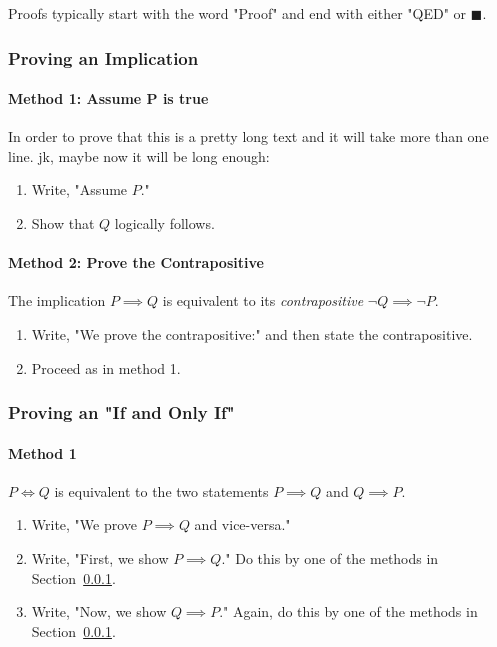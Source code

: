 \documentclass[../main.tex]{subfiles}
\begin{document}
Proofs typically start with the word "Proof" and end with either "QED" or $\blacksquare$.

\subsubsection{Proving an Implication}
\label{sec:prove_implication}

\paragraph{Method 1: Assume P is true}

In order to prove that this is a pretty long text and it will take more than one line. jk, maybe now it will be long enough:

\begin{enumerate}
  \item Write, "Assume $P$."
  \item Show that $Q$ logically follows.
\end{enumerate}

\paragraph{Method 2: Prove the Contrapositive}
The implication $P \implies Q$ is equivalent to its \textit{contrapositive} $\neg Q \implies \neg P$.

\begin{enumerate}
  \item Write, "We prove the contrapositive:" and then state the contrapositive.
  \item Proceed as in method 1.
\end{enumerate}

\subsubsection{Proving an "If and Only If"}

\paragraph{Method 1}

$P \iff Q$ is equivalent to the two statements $P \implies Q$ and $Q \implies P$.

\begin{enumerate}
  \item Write, "We prove $P \implies Q$ and vice-versa."
  \item Write, "First, we show $P \implies Q$." Do this by one of the methods in Section~\ref{sec:prove_implication}.
  \item Write, "Now, we show $Q \implies P$." Again, do this by one of the methods in Section~\ref{sec:prove_implication}.
\end{enumerate}
\end{document}
